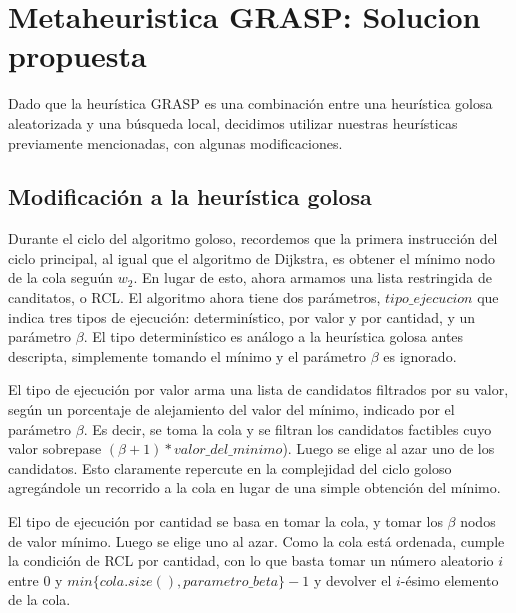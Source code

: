 \section{Metaheuristica GRASP: Solucion propuesta}

Dado que la heur\'istica GRASP es una combinaci\'on entre una heur\'istica golosa aleatorizada y una b\'usqueda local, decidimos utilizar nuestras heur\'isticas previamente mencionadas, con algunas modificaciones.

\subsection{Modificaci\'on a la heur\'istica golosa}

\vspace{2mm}

Durante el ciclo del algoritmo goloso, recordemos que la primera instrucci\'on del ciclo principal, al igual que el algoritmo de Dijkstra, es obtener el m\'inimo nodo de la cola segu\'un $w_2$. En lugar de esto, ahora armamos una lista restringida de canditatos, o RCL. El algoritmo ahora tiene dos par\'ametros, $tipo\_ejecucion$ que indica tres tipos de ejecuci\'on: determin\'istico, por valor y por cantidad, y un par\'ametro $\beta$. El tipo determin\'istico es an\'alogo a la heur\'istica golosa antes descripta, simplemente tomando el m\'inimo y el par\'ametro $\beta$ es ignorado.

\vspace{2mm}

El tipo de ejecuci\'on por valor arma una lista de candidatos filtrados por su valor, seg\'un un porcentaje de alejamiento del valor del m\'inimo, indicado por el par\'ametro $\beta$. Es decir, se toma la cola y se filtran los candidatos factibles cuyo valor sobrepase $(\beta + 1)*valor\_del\_minimo$). Luego se elige al azar uno de los candidatos. Esto claramente repercute en la complejidad del ciclo goloso agreg\'andole un recorrido a la cola en lugar de una simple obtenci\'on del m\'inimo.
\vspace{2mm}

El tipo de ejecuci\'on por cantidad se basa en tomar la cola, y tomar los $\beta$ nodos de valor m\'inimo. Luego se elige uno al azar. Como la cola est\'a ordenada, cumple la condici\'on de RCL por cantidad, con lo que basta tomar un n\'umero aleatorio $i$ entre $0$ y  $min\{cola.size(), parametro\_beta\} -1$ y devolver el $i$-\'esimo elemento de la cola.

\vspace{2mm}


